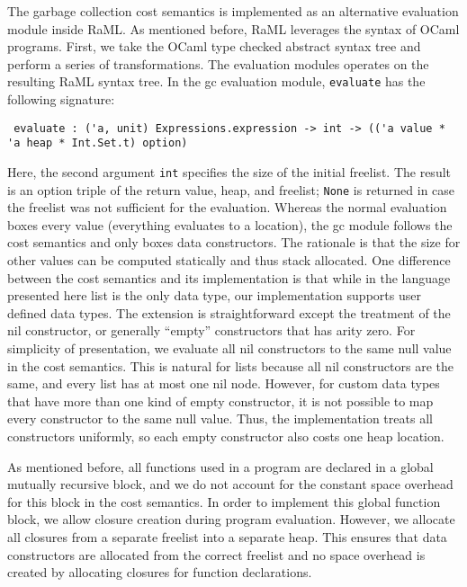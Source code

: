 \documentclass{easychair}
\theoremstyle{definition}
\begin{document}
The garbage collection cost semantics is implemented as an alternative evaluation module inside
RaML. As mentioned before, RaML leverages the syntax of OCaml programs.
First, we take the OCaml type checked abstract syntax tree and perform a series of transformations. 
The evaluation modules operates on the resulting RaML syntax tree. 
In the gc evaluation module, \texttt{evaluate} has the following signature:
{\small%
\begin{verbatim}
 evaluate : ('a, unit) Expressions.expression -> int -> (('a value * 'a heap * Int.Set.t) option) 
\end{verbatim}
}
Here, the second argument \texttt{int} specifies the size of the initial freelist.
The result is an option triple of the return value, heap, and freelist; \texttt{None} is returned
in case the freelist was not sufficient for the evaluation.
Whereas the normal evaluation boxes every value (everything evaluates to a location), 
the gc module follows the cost semantics and only boxes data constructors. The rationale is
that the size for other values can be computed statically and thus stack allocated. One difference
between the cost semantics and its implementation is that while in the language presented here
list is the only data type, our implementation supports user defined data types. The extension
is straightforward except the treatment of the nil constructor, or generally ``empty'' constructors
that has arity zero. For simplicity of presentation, we evaluate all nil constructors to
the same null value in the cost semantics. This is natural for lists because all nil constructors 
are the same, and every list has at most one nil node. However, for custom data types that have 
more than one kind of empty constructor, it is not possible to map every constructor to the same 
null value. Thus, the implementation treats all constructors uniformly, so each empty constructor
also costs one heap location. 

As mentioned before, all functions used in a program are declared in a global mutually 
recursive block, and we do not account for the constant space overhead for this block in 
the cost semantics.  In order to implement this global function block, we allow closure creation
during program evaluation. However, we allocate all closures from a separate freelist into 
a separate heap.  This ensures that data constructors are allocated from the correct freelist 
and no space overhead is created by allocating closures for function declarations.
\end{document}
